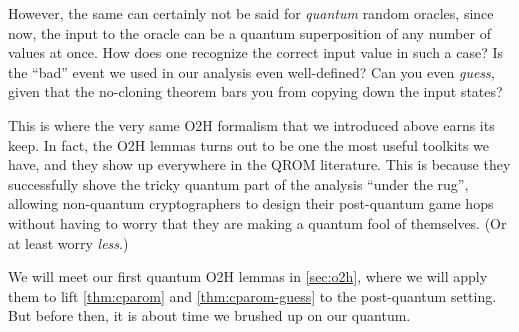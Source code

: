   However, the same can certainly not be said for \emph{quantum} random
    oracles, since now, the input to the oracle can be a quantum superposition
    of any number of values at once. How does one recognize the correct input value
    in such a case? Is the ``bad'' event we used in our analysis
    even well-defined? Can you even \emph{guess}, given that the no-cloning
    theorem bars you from copying down the input states?

  This is where the very same O2H formalism that we introduced above earns its
    keep. In fact, the O2H lemmas turns out to be one the most useful toolkits
    we have, and they show up everywhere in the QROM literature. 
    This is because they successfully shove the tricky quantum part of the analysis
    ``under the rug'', allowing non-quantum cryptographers to design their post-quantum
    game hops without having to worry that they are making a quantum fool of
    themselves. (Or at least worry \emph{less}.)

  We will meet our first quantum O2H
    lemmas in \cref{sec:o2h}, where we will apply them to lift
    \cref{thm:cparom} and \cref{thm:cparom-guess} to the post-quantum
    setting. But before then, it is about time we brushed up on our quantum. 

